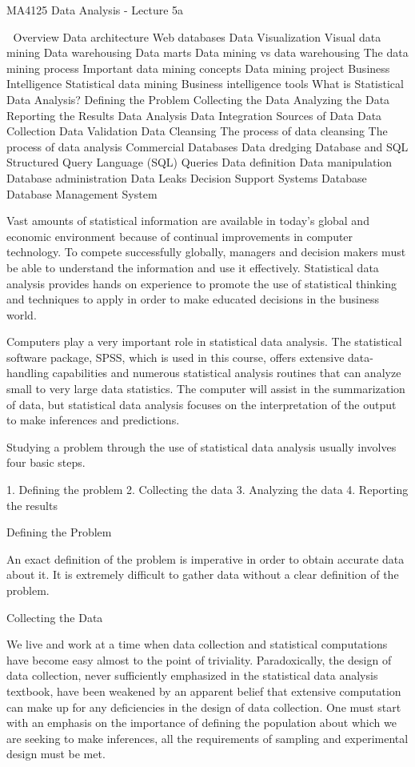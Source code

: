 MA4125 Data Analysis - Lecture 5a



Overview
Data architecture
Web databases
Data Visualization
Visual data mining
Data warehousing
Data marts
Data mining vs data warehousing
The data mining process
Important data mining concepts
Data mining project
Business Intelligence
Statistical data mining
Business intelligence tools
What is Statistical Data Analysis?
Defining the Problem
Collecting the Data
Analyzing the Data
Reporting the Results
Data Analysis
Data Integration
Sources of Data
Data Collection
Data Validation
Data Cleansing
The process of data cleansing
The process of data analysis
Commercial Databases
Data dredging
Database and SQL
Structured Query Language (SQL)
Queries
Data definition
Data manipulation
Database administration
Data Leaks
Decision Support Systems
Database
Database Management System


Vast amounts of statistical information are available in today's global and economic environment because of continual improvements in computer technology. To compete successfully globally, managers and decision makers must be able to understand the information and use it effectively. Statistical data analysis provides hands on experience to promote the use of statistical thinking and techniques to apply in order to make educated decisions in the business world.

Computers play a very important role in statistical data analysis. The statistical software package, SPSS, which is used in this course, offers extensive data-handling capabilities and numerous statistical analysis routines that can analyze small to very large data statistics. The computer will assist in the summarization of data, but statistical data analysis focuses on the interpretation of the output to make inferences and predictions.

Studying a problem through the use of statistical data analysis usually involves four basic steps.

1. Defining the problem 
2. Collecting the data 
3. Analyzing the data 
4. Reporting the results

Defining the Problem

An exact definition of the problem is imperative in order to obtain accurate data about it. It is extremely difficult to gather data without a clear definition of the problem.

Collecting the Data

We live and work at a time when data collection and statistical computations have become easy almost to the point of triviality. Paradoxically, the design of data collection, never sufficiently emphasized in the statistical data analysis textbook, have been weakened by an apparent belief that extensive computation can make up for any deficiencies in the design of data collection. One must start with an emphasis on the importance of defining the population about which we are seeking to make inferences, all the requirements of sampling and experimental design must be met.

